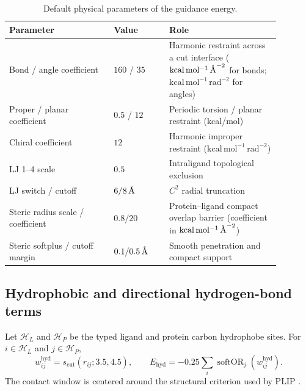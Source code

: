 \documentclass{article}
\newcommand{\angstrom}{\text{\normalfont\AA}}
\newcommand{\citep}[1]{\cite{#1}}
\begin{document}
\begin{table}[tbp]
    \centering
    \caption{Default physical parameters of the guidance energy.}
    \label{tab:si_physical_parameters}
    \begin{tabular}{>{\raggedright\arraybackslash}p{0.34\linewidth}>{\raggedright\arraybackslash}p{0.18\linewidth}>{\raggedright\arraybackslash}p{0.36\linewidth}}
        \toprule
        Parameter & Value & Role \\
        \midrule
        Bond / angle coefficient & \(160\) / \(35\) & {\raggedright Harmonic restraint across a cut interface (\(\mathrm{kcal\,mol^{-1}\,\angstrom^{-2}}\) for bonds; \(\mathrm{kcal\,mol^{-1}\,rad^{-2}}\) for angles)\par} \\
        Proper / planar coefficient & \(0.5\) / \(12\) & Periodic torsion / planar restraint (kcal/mol) \\
        Chiral coefficient & \(12\) & Harmonic improper restraint (\(\mathrm{kcal\,mol^{-1}\,rad^{-2}}\)) \\
        LJ 1--4 scale & \(0.5\) & Intraligand topological exclusion \\
        LJ switch / cutoff & \(6/8\,\angstrom\) & \(C^2\) radial truncation \\
        Steric radius scale / coefficient & \(0.8/20\) & Protein--ligand compact overlap barrier (coefficient in \(\mathrm{kcal\,mol^{-1}\,\angstrom^{-2}}\)) \\
        Steric softplus / cutoff margin & \(0.1/0.5\,\angstrom\) & Smooth penetration and compact support \\
        \bottomrule
    \end{tabular}
\end{table}

\subsection{Hydrophobic and directional hydrogen-bond terms}

Let \(\mathcal H_L\) and \(\mathcal H_P\) be the typed ligand and protein carbon hydrophobe sites.
For \(i\in\mathcal H_L\) and \(j\in\mathcal H_P\),
\begin{equation}
    w_{ij}^{\mathrm{hyd}}=s_{\mathrm{cut}}(r_{ij};3.5,4.5),
    \qquad
    E_{\mathrm{hyd}}
    =-0.25\sum_i\operatorname{softOR}_j(w_{ij}^{\mathrm{hyd}}).
    \label{eq:si_hydrophobic}
\end{equation}
The contact window is centered around the structural criterion used by PLIP \citep{salentin2015plip}.
\end{document}

